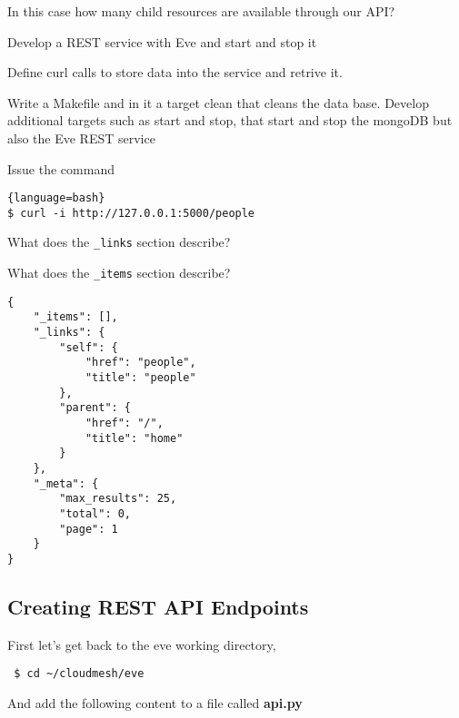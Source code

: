 \begin{exercise}
In this case how many child resources are available through
our API?
\end{exercise}

\begin{exercise}
Develop a REST service with Eve and start and stop it
\end{exercise}

\begin{exercise}
Define curl calls to store data into the service and retrive it.
\end{exercise}

\begin{exercise}
Write a Makefile and in it a target clean that cleans the data
base. Develop additional targets such as start and stop, that start
and stop the mongoDB but also the Eve REST service
\end{exercise}


\begin{exercise}
Issue the command

\begin{lstlisting}{language=bash}
$ curl -i http://127.0.0.1:5000/people
\end{lstlisting}

What does the \verb|_links| section describe?

What does the \verb|_items| section describe?

\begin{lstlisting}
{
    "_items": [],
    "_links": {
        "self": {
            "href": "people",
            "title": "people"
        },
        "parent": {
            "href": "/",
            "title": "home"
        }
    },
    "_meta": {
        "max_results": 25,
        "total": 0,
        "page": 1
    }
}
\end{lstlisting} 
\end{exercise}

\clearpage

\subsection{Creating REST API Endpoints}\label{s:rest-api-endpoints}

First let's get back to the eve working directory,

\begin{lstlisting}
 $ cd ~/cloudmesh/eve
\end{lstlisting}

And add the following content to a file called \textbf{api.py}

